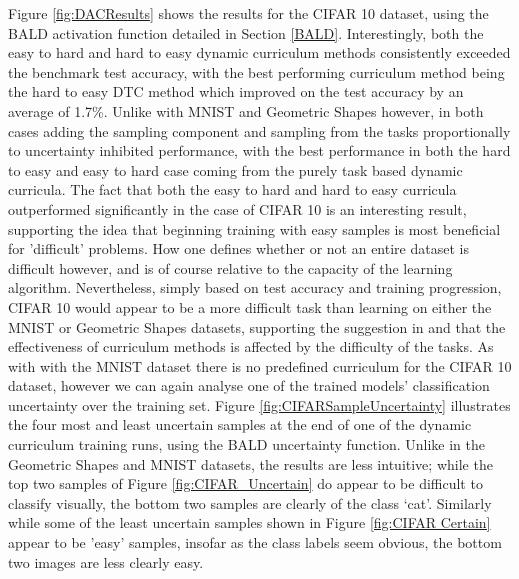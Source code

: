 Figure \ref{fig:DACResults} shows the results for the CIFAR 10 dataset, using the BALD activation function detailed in Section \ref{BALD}. Interestingly, both the easy to hard and hard to easy dynamic curriculum methods consistently exceeded the benchmark test accuracy, with the best performing curriculum method being the hard to easy DTC method which improved on the test accuracy by an average of 1.7\%. Unlike with MNIST and Geometric Shapes however, in both cases adding the sampling component and sampling from the tasks proportionally to uncertainty inhibited performance, with the best performance in both the hard to easy and easy to hard case coming from the purely task based dynamic curricula. The fact that both the easy to hard and hard to easy curricula outperformed significantly in the case of CIFAR 10 is an interesting result, supporting the idea that beginning training with easy samples is most beneficial for 'difficult' problems. How one defines whether or not an entire dataset is difficult however, and is of course relative to the capacity of the learning algorithm. Nevertheless, simply based on test accuracy and training progression, CIFAR 10 would appear to be a more difficult task than learning on either the MNIST or Geometric Shapes datasets, supporting the suggestion in \cite{Chang18} and \cite{weinshall2018curriculum} that the effectiveness of curriculum methods is affected by the difficulty of the tasks. As with with the MNIST dataset there is no predefined curriculum for the CIFAR 10 dataset, however we can again analyse one of the trained models' classification uncertainty over the training set. Figure \ref{fig:CIFARSampleUncertainty} illustrates the four most and least uncertain samples at the end of one of the dynamic curriculum training runs, using the BALD uncertainty function. Unlike in the Geometric Shapes and MNIST datasets, the results are less intuitive; while the top two samples of Figure \ref{fig:CIFAR_Uncertain} do appear to be difficult to classify visually, the bottom two samples are clearly of the class `cat'. Similarly while some of the least uncertain samples shown in Figure \ref{fig:CIFAR Certain} appear to be 'easy' samples, insofar as the class labels seem obvious, the bottom two images are less clearly easy. 
